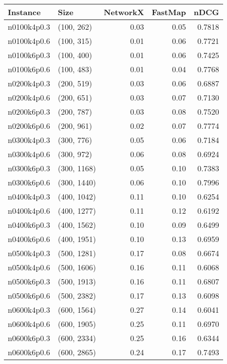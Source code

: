 \begin{tabular}{llrrr}
\toprule
   Instance &          Size &  NetworkX &  FastMap &   nDCG \\
\midrule
n0100k4p0.3 &    (100, 262) &      0.03 &     0.05 & 0.7818 \\
n0100k4p0.6 &    (100, 315) &      0.01 &     0.06 & 0.7721 \\
n0100k6p0.3 &    (100, 400) &      0.01 &     0.06 & 0.7425 \\
n0100k6p0.6 &    (100, 483) &      0.01 &     0.04 & 0.7768 \\
n0200k4p0.3 &    (200, 519) &      0.03 &     0.06 & 0.6887 \\
n0200k4p0.6 &    (200, 651) &      0.03 &     0.07 & 0.7130 \\
n0200k6p0.3 &    (200, 787) &      0.03 &     0.08 & 0.7520 \\
n0200k6p0.6 &    (200, 961) &      0.02 &     0.07 & 0.7774 \\
n0300k4p0.3 &    (300, 776) &      0.05 &     0.06 & 0.7184 \\
n0300k4p0.6 &    (300, 972) &      0.06 &     0.08 & 0.6924 \\
n0300k6p0.3 &   (300, 1168) &      0.05 &     0.10 & 0.7383 \\
n0300k6p0.6 &   (300, 1440) &      0.06 &     0.10 & 0.7996 \\
n0400k4p0.3 &   (400, 1042) &      0.11 &     0.10 & 0.6254 \\
n0400k4p0.6 &   (400, 1277) &      0.11 &     0.12 & 0.6192 \\
n0400k6p0.3 &   (400, 1562) &      0.10 &     0.09 & 0.6499 \\
n0400k6p0.6 &   (400, 1951) &      0.10 &     0.13 & 0.6959 \\
n0500k4p0.3 &   (500, 1281) &      0.17 &     0.08 & 0.6674 \\
n0500k4p0.6 &   (500, 1606) &      0.16 &     0.11 & 0.6068 \\
n0500k6p0.3 &   (500, 1913) &      0.16 &     0.11 & 0.6807 \\
n0500k6p0.6 &   (500, 2382) &      0.17 &     0.13 & 0.6098 \\
n0600k4p0.3 &   (600, 1564) &      0.27 &     0.14 & 0.6041 \\
n0600k4p0.6 &   (600, 1905) &      0.25 &     0.11 & 0.6970 \\
n0600k6p0.3 &   (600, 2334) &      0.25 &     0.16 & 0.6344 \\
n0600k6p0.6 &   (600, 2865) &      0.24 &     0.17 & 0.7493 \\

\end{tabular}
